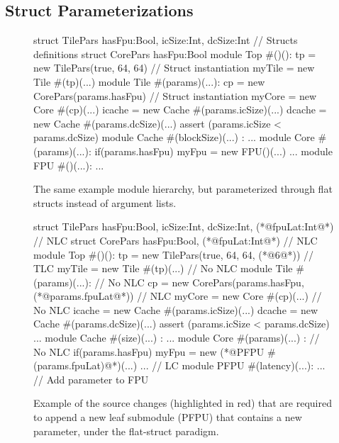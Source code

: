 \subsection{Struct Parameterizations}

\begin{figure}
\centering
\begin{phdl}
struct TilePars {hasFpu:Bool, icSize:Int, dcSize:Int} // Structs definitions
struct CorePars {hasFpu:Bool}
module Top #()():
  tp = new TilePars(true, 64, 64)                     // Struct instantiation
  myTile = new Tile #(tp)(...)
module Tile #(params)(...):
  cp = new CorePars(params.hasFpu)                    // Struct instantiation
  myCore = new Core  #(cp)(...)
  icache = new Cache #(params.icSize)(...)
  dcache = new Cache #(params.dcSize)(...)
  assert (params.icSize < params.dcSize)
module Cache #(blockSize)(...) : ...
module Core #(params)(...):
  if(params.hasFpu) myFpu = new FPU()(...) ...
module FPU #()(...): ...
\end{phdl} 
\caption[Parameterizing the example with flat structs.]{The same example module hierarchy, but parameterized through flat structs instead of argument lists.}
\label{fig:flatstruct}
\end{figure}

\begin{figure}
\centering
\begin{phdl}
struct TilePars {hasFpu:Bool, icSize:Int, dcSize:Int, (*@\textcolor[rgb]{1,0,0}{fpuLat:Int}@*)} // NLC
struct CorePars {hasFpu:Bool, (*@\textcolor[rgb]{1,0,0}{fpuLat:Int}@*)}                         // NLC
module Top #()():
  tp = new TilePars(true, 64, 64, (*@\textcolor[rgb]{1,0,0}{6}@*))                              // TLC
  myTile = new Tile #(tp)(...)                                    // No NLC
module Tile #(params)(...):                                       // No NLC
  cp = new CorePars(params.hasFpu, (*@\textcolor[rgb]{1,0,0}{params.fpuLat}@*))                 // NLC
  myCore = new Core  #(cp)(...)                                   // No NLC
  icache = new Cache #(params.icSize)(...)
  dcache = new Cache #(params.dcSize)(...)
  assert (params.icSize < params.dcSize) ...
module Cache #(size)(...) : ...
module Core #(params)(...) :                                     // No NLC
  if(params.hasFpu) myFpu = new (*@\textcolor[rgb]{1,0,0}{PFPU \#(params.fpuLat)}@*)(...) ...   // LC
module PFPU #(latency)(...): ...     // Add parameter to FPU 
\end{phdl} 
\caption[Modifying the example with flat structs.]{
Example of the source changes (highlighted in red) that are required to append a new leaf submodule (PFPU) that contains a new parameter,
under the flat-struct paradigm.}
\label{fig:flatstruct-delta}
\end{figure}

